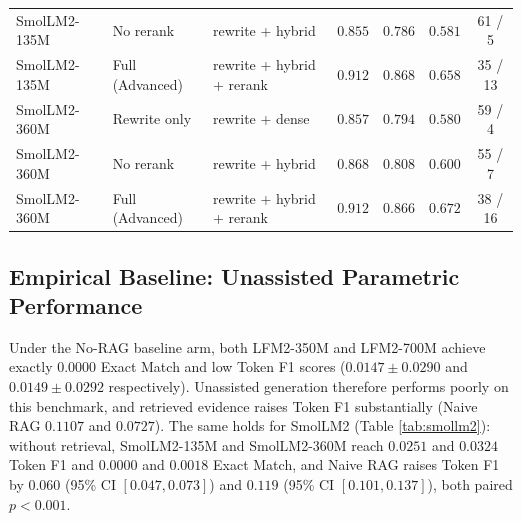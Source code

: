 \documentclass[10pt]{article}
\begin{document}
\begin{table}[t]
\begin{tabular}{lllcccc}
SmolLM2-135M & No rerank & rewrite + hybrid & $0.855$ & $0.786$ & $0.581$ & 61 / 5 \\
SmolLM2-135M & Full (Advanced) & rewrite + hybrid + rerank & $0.912$ & $0.868$ & $0.658$ & 35 / 13 \\
\midrule
SmolLM2-360M & Rewrite only & rewrite + dense & $0.857$ & $0.794$ & $0.580$ & 59 / 4 \\
SmolLM2-360M & No rerank & rewrite + hybrid & $0.868$ & $0.808$ & $0.600$ & 55 / 7 \\
SmolLM2-360M & Full (Advanced) & rewrite + hybrid + rerank & $0.912$ & $0.866$ & $0.672$ & 38 / 16 \\
\bottomrule
\end{tabular}
\end{table}

\subsection{Empirical Baseline: Unassisted Parametric Performance}
Under the No-RAG baseline arm, both LFM2-350M and LFM2-700M achieve exactly $0.0000$ Exact Match and low Token F1 scores ($0.0147 \pm 0.0290$ and $0.0149 \pm 0.0292$ respectively). Unassisted generation therefore performs poorly on this benchmark, and retrieved evidence raises Token F1 substantially (Naive RAG $0.1107$ and $0.0727$). The same holds for SmolLM2 (Table \ref{tab:smollm2}): without retrieval, SmolLM2-135M and SmolLM2-360M reach $0.0251$ and $0.0324$ Token F1 and $0.0000$ and $0.0018$ Exact Match, and Naive RAG raises Token F1 by $0.060$ (95\% CI $[0.047, 0.073]$) and $0.119$ (95\% CI $[0.101, 0.137]$), both paired $p<0.001$.
\end{document}
